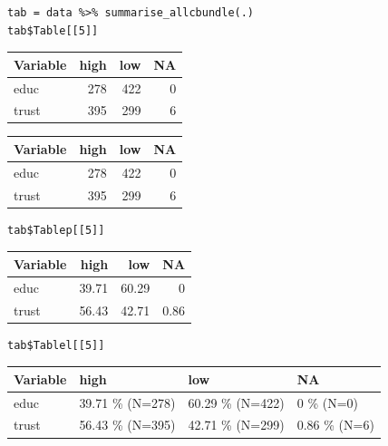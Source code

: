 \documentclass[a4paper]{article}
\begin{document}
\lstset{numbers=left,language=r,label= ,caption= ,captionpos=b}
\begin{lstlisting}
tab = data %>% summarise_allcbundle(.)
tab$Table[[5]]
\end{lstlisting}

\begin{center}
\begin{tabular}{lrrr}
Variable & high & low & NA\\
\hline
educ & 278 & 422 & 0\\
trust & 395 & 299 & 6\\
\end{tabular}
\end{center}

\begin{center}
\begin{tabular}{lrrr}
Variable & high & low & NA\\
\hline
educ & 278 & 422 & 0\\
trust & 395 & 299 & 6\\
\end{tabular}
\end{center}



\lstset{numbers=left,language=r,label=org4725b74,caption= ,captionpos=b}
\begin{lstlisting}
tab$Tablep[[5]]
\end{lstlisting}

\begin{center}
\begin{tabular}{lrrr}
Variable & high & low & NA\\
\hline
educ & 39.71 & 60.29 & 0\\
trust & 56.43 & 42.71 & 0.86\\
\end{tabular}
\end{center}



\lstset{numbers=left,language=r,label=orgeac9403,caption= ,captionpos=b}
\begin{lstlisting}
tab$Tablel[[5]]
\end{lstlisting}

\begin{center}
\begin{tabular}{llll}
Variable & high & low & NA\\
\hline
educ & 39.71 \% (N=278) & 60.29 \% (N=422) & 0 \% (N=0)\\
trust & 56.43 \% (N=395) & 42.71 \% (N=299) & 0.86 \% (N=6)\\
\end{tabular}
\end{center}
\end{document}
